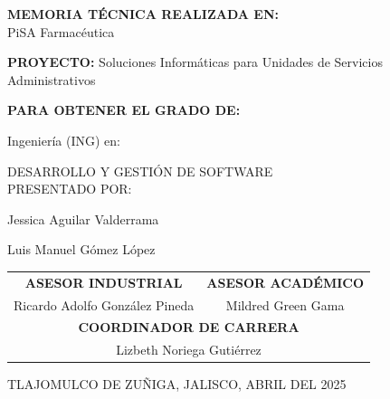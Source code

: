 \documentclass[12pt,letterpaper,spanish, xcolor=table]{report}
\numberwithin{figure}{subsection}
\begin{document}
\begin{center}
	
\large{\textbf{MEMORIA TÉCNICA REALIZADA EN:}}
 \\ PiSA Farmacéutica

\centerline{\hbox{}}

\large{\textbf{PROYECTO:} Soluciones Informáticas para Unidades de Servicios Administrativos}

\vspace{0.1in}
\large{\textbf{PARA OBTENER EL GRADO DE:}}

\large{Ingeniería (ING) en:}
\vspace{0.05in}

\large{DESARROLLO Y GESTIÓN DE SOFTWARE}
\\
\large{PRESENTADO POR:}

Jessica Aguilar Valderrama %

Luis Manuel Gómez López %

\vspace{0.2in}

\begin{tabular}{cc}
	\vspace{0.2in}
	\textbf{ASESOR INDUSTRIAL} & \textbf{ASESOR ACADÉMICO} \\
	
	Ricardo Adolfo González Pineda & Mildred Green Gama\\
	\multicolumn{2}{c}{\textbf{COORDINADOR DE CARRERA}
	\vspace{0.2in}
	} \\
	
	\multicolumn{2}{c}{
			Lizbeth Noriega Gutiérrez }
	\end{tabular}
	
\end{center}
\begin{flushright}\small{ TLAJOMULCO DE ZUÑIGA, JALISCO, ABRIL DEL 2025} \end{flushright}

\newpage




\end{document}
